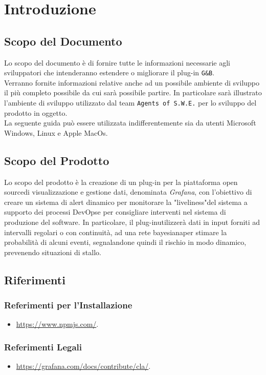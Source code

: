 \section{Introduzione}\label{Intro}
\subsection{Scopo del Documento}
Lo scopo del documento è di fornire tutte le informazioni necessarie agli sviluppatori che intenderanno estendere o migliorare il plug-in \texttt{G\&B}.\\
Verranno fornite informazioni relative anche ad un possibile ambiente di sviluppo il più completo possibile da cui sarà possibile partire. In particolare sarà illustrato l'ambiente di sviluppo utilizzato dal team \texttt{Agents of S.W.E.} per lo sviluppo del prodotto in oggetto.\\
La seguente guida può essere utilizzata indifferentemente sia da utenti Microsoft Windows, Linux e Apple MacOs.


\subsection{Scopo del Prodotto}
Lo scopo del prodotto è la creazione di un plug-in per la piattaforma open source\glossario di visualizzazione e gestione dati, denominata \textit{Grafana}\glossario , con l’obiettivo di creare un sistema di alert dinamico per monitorare la "liveliness"\glossario del sistema a supporto dei processi DevOps\glossario e per consigliare interventi nel sistema di produzione del software.
In particolare, il plug-in\glossario utilizzerà dati in input forniti ad intervalli regolari o con continuità, ad una rete bayesiana\glossario per stimare la probabilità di alcuni eventi, segnalandone quindi il rischio in modo dinamico, prevenendo situazioni di stallo.


\subsection{Riferimenti}\label{Riferimenti}
\subsubsection{Referimenti per l'Installazione}
\begin{itemize}
	\item \url{https://www.npmjs.com/}.
\end{itemize}

\subsubsection{Referimenti Legali}
\begin{itemize}
	\item \url{https://grafana.com/docs/contribute/cla/}.
\end{itemize}

